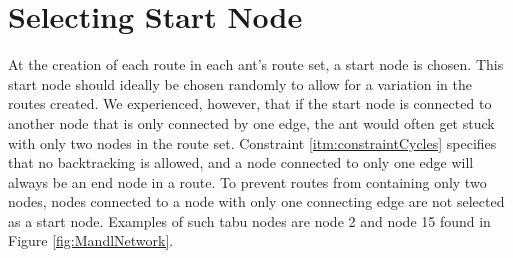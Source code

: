 \section{Selecting Start Node}

At the creation of each route in each ant's route set, a start node is chosen. This start node should ideally be chosen randomly to allow for a variation in the routes created. We experienced, however, that if the start node is connected to another node that is only connected by one edge, the ant would often get stuck with only two nodes in the route set. Constraint \vref{itm:constraintCycles} specifies that no backtracking is allowed, and a node connected to only one edge will always be an end node in a route. To prevent routes from containing only two nodes, nodes connected to a node with only one connecting edge are not selected as a start node. Examples of such tabu nodes are node 2 and node 15 found in Figure \vref{fig:MandlNetwork}. 